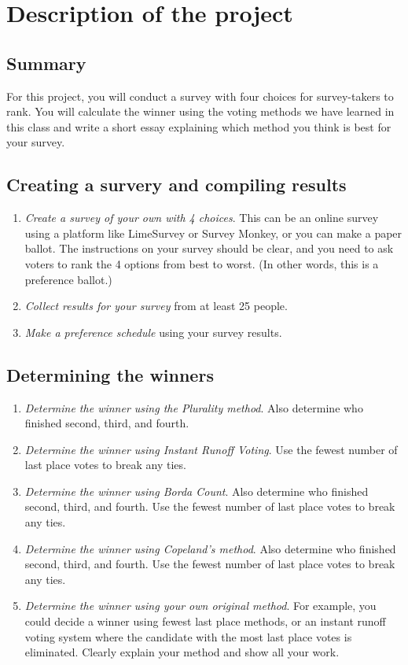 \section{Description of the project}

\subsection*{Summary} For this project, you will conduct a %
survey with four choices for survey-takers to rank. You will calculate the winner using the
voting methods we have learned in this class and write a short
essay explaining which method you think is best for your survey.
\vspace{0.5cm}

\subsection*{Creating a survery and compiling results}
\begin{enumerate}
\item \emph{Create a survey of your own with 4 choices}. This can
  be an online survey using a platform like LimeSurvey or Survey
  Monkey, or you can make a paper ballot. The instructions on your
  survey should be clear, and you need to ask voters to rank the 4
  options from best to worst. (In other words, this is a preference
  ballot.)
\item \emph{Collect results for your survey} from at least 25
    people.
\item \emph{Make a preference schedule} using your survey
  results.
\end{enumerate}
\vspace{0.5cm}

\subsection*{Determining the winners}
\begin{enumerate}
  \item \emph{Determine the winner using the Plurality
      method}. Also determine who finished second, third, and fourth.
      
  \item \emph{Determine the winner using Instant Runoff Voting}.
    Use the fewest number of last place votes to break any
    ties.
  \item \emph{Determine the winner using Borda Count}.
    Also determine who finished second, third, and fourth. 
    Use the fewest number of last place votes to break any
    ties.
  \item \emph{Determine the winner using Copeland's
      method}. Also determine who finished second, third, and fourth.
    Use the fewest number of last place votes to break any
    ties.
  \item \emph{Determine the winner using your own original
      method}. For example, you could decide a winner using fewest
    last place methods, or an instant runoff voting system where the
    candidate with the most last place votes is eliminated. Clearly
    explain your method and show all your work.
\end{enumerate}


